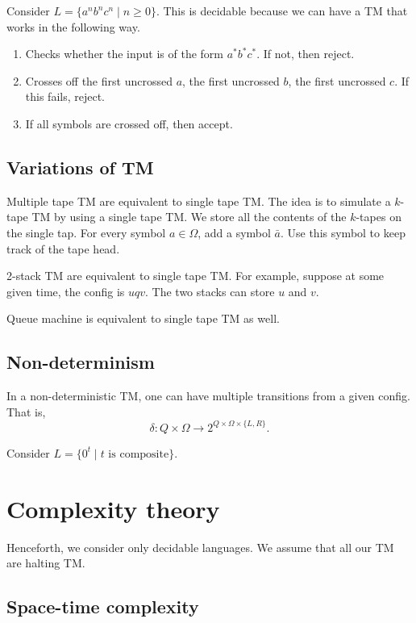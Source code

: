 \documentclass{article}
\begin{document}
Consider $L = \{a^nb^nc^n \mid n \geq 0\}$. This is decidable because we can have a TM that works in the following way.
\begin{enumerate}
\item\label{item:53} Checks whether the input is of the form $a^{*}b^{*}c^{*}$. If not, then reject. 
\item\label{item:54} Crosses off the first uncrossed $a$, the first uncrossed $b$, the first uncrossed $c$. If this fails, reject. 
\item\label{item:55} If all symbols are crossed off, then accept.
\end{enumerate}

\subsection{Variations of TM}

Multiple tape TM are equivalent to single tape TM. The idea is to simulate a $k$-tape TM by using a single tape TM. We store all the contents of the $k$-tapes on the single tap. For every symbol $a \in \Omega$, add a symbol $\bar{a}$. Use this symbol to keep track of the tape head.

2-stack TM are equivalent to single tape TM. For example, suppose at some given time, the config is $uqv$. The two stacks can store $u$ and $v$.

Queue machine is equivalent to single tape TM as well.

\subsection{Non-determinism}

In a non-deterministic TM, one can have multiple transitions from a given config. That is, 
\begin{displaymath}
  \delta: Q \times \Omega \to 2^{Q \times \Omega \times \{L, R\}}.
\end{displaymath}

Consider $L = \{ 0^t \mid t \text{ is composite} \}$.

\section{Complexity theory}

Henceforth, we consider only decidable languages. We assume that all our TM are halting TM.

\subsection{Space-time complexity}
\end{document}
